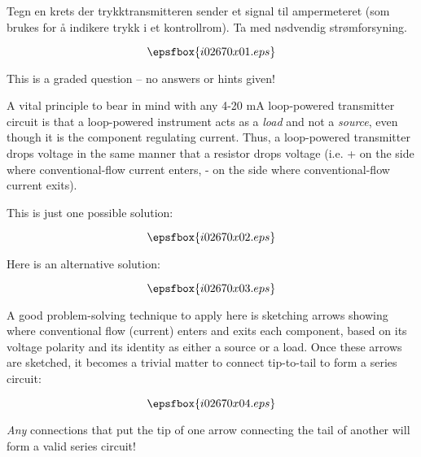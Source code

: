 


Tegn en krets der trykktransmitteren sender et signal til ampermeteret (som brukes for {\aa} indikere trykk i et kontrollrom). Ta med n{\o}dvendig str{\o}mforsyning. 

\vskip 50pt

$$\epsfbox{i02670x01.eps}$$

\vfil 

\eject






This is a graded question -- no answers or hints given!







A vital principle to bear in mind with any 4-20 mA loop-powered transmitter circuit is that a loop-powered instrument acts as a {\it load} and not a {\it source}, even though it is the component regulating current.  Thus, a loop-powered transmitter drops voltage in the same manner that a resistor drops voltage (i.e. + on the side where conventional-flow current enters, - on the side where conventional-flow current exits).

\vskip 10pt

This is just one possible solution:

$$\epsfbox{i02670x02.eps}$$

\vskip 10pt

Here is an alternative solution:

$$\epsfbox{i02670x03.eps}$$

\filbreak

A good problem-solving technique to apply here is sketching arrows showing where conventional flow (current) enters and exits each component, based on its voltage polarity and its identity as either a source or a load.  Once these arrows are sketched, it becomes a trivial matter to connect tip-to-tail to form a series circuit:

$$\epsfbox{i02670x04.eps}$$

{\it Any} connections that put the tip of one arrow connecting the tail of another will form a valid series circuit!





